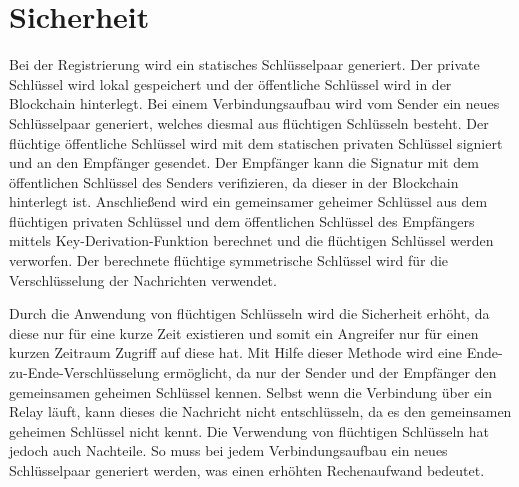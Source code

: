 \section{Sicherheit}
\label{subsec:sicherheit}


Bei der Registrierung wird ein statisches Schlüsselpaar generiert. Der private Schlüssel wird lokal gespeichert und der öffentliche Schlüssel wird in der Blockchain hinterlegt. Bei einem Verbindungsaufbau wird vom Sender ein neues Schlüsselpaar generiert, welches diesmal aus flüchtigen Schlüsseln besteht. Der flüchtige öffentliche Schlüssel wird mit dem statischen privaten Schlüssel signiert und an den Empfänger gesendet. Der Empfänger kann die Signatur mit dem öffentlichen Schlüssel des Senders verifizieren, da dieser in der Blockchain hinterlegt ist. Anschließend wird ein gemeinsamer geheimer Schlüssel aus dem flüchtigen privaten Schlüssel und dem öffentlichen Schlüssel des Empfängers mittels Key-Derivation-Funktion berechnet und die flüchtigen Schlüssel werden verworfen. Der berechnete flüchtige symmetrische Schlüssel wird für die Verschlüsselung der Nachrichten verwendet.

Durch die Anwendung von flüchtigen Schlüsseln wird die Sicherheit erhöht, da diese nur für eine kurze Zeit existieren und somit ein Angreifer nur für einen kurzen Zeitraum Zugriff auf diese hat.
Mit Hilfe dieser Methode wird eine Ende-zu-Ende-Verschlüsselung ermöglicht, da nur der Sender und der Empfänger den gemeinsamen geheimen Schlüssel kennen. Selbst wenn die Verbindung über ein Relay läuft, kann dieses die Nachricht nicht entschlüsseln, da es den gemeinsamen geheimen Schlüssel nicht kennt.
Die Verwendung von flüchtigen Schlüsseln hat jedoch auch Nachteile. So muss bei jedem Verbindungsaufbau ein neues Schlüsselpaar generiert werden, was einen erhöhten Rechenaufwand bedeutet. 

